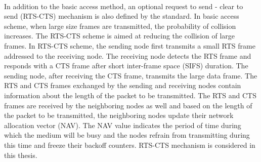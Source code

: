 \documentclass[12pt,letterpaper,english]{article}
\begin{document}
\\
\indent In addition to the basic access method, an optional request to send - clear to send (RTS-CTS) mechanism is also defined by the standard. In basic access scheme, when large size frames are transmitted, the probability of collision increases. The RTS-CTS scheme is aimed at reducing the collision of large frames. In RTS-CTS scheme, the sending node first transmits a small RTS frame addressed to the receiving node. The receiving node detects the RTS frame and responds with a CTS frame after short inter-frame space (SIFS) duration. The sending node, after receiving the CTS frame, transmits the large data frame. The RTS and CTS frames exchanged by the sending and receiving nodes contain information about the length of the packet to be transmitted. The RTS and CTS frames are received by the neighboring nodes as well and based on the length of the packet to be transmitted, the neighboring nodes update their network allocation vector (NAV). The NAV value indicates the period of time during which the medium will be busy and the nodes refrain from transmitting during this time and freeze their backoff counters. RTS-CTS mechanism is considered in this thesis.
\end{document}
